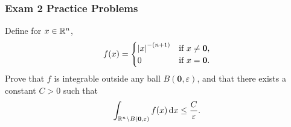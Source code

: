 \subsubsection{Exam 2 Practice Problems}
\setcounter{exercise}{0}
\setcounter{equation}{0}

\begin{problem}
Define for $ x \in\mathbb{R}^n$,
\[
f( x )=
\begin{cases}
\left| x \right|^{-(n+1)}&\text{if $ x \neq \mathbf{0}$,}\\
0&\text{if $ x =\mathbf{0}$.}
\end{cases}
\]
Prove that $f$ is integrable outside any ball $B(\mathbf{0},\varepsilon)$,
and that there exists a constant $C>0$ such that
\[
\int_{\mathbb{R}^n\setminus B(\mathbf{0},\varepsilon)}f( x ) \mathop{}\!\mathrm{d}  x \leq\frac{C}{\varepsilon}.
\]
\end{problem}
